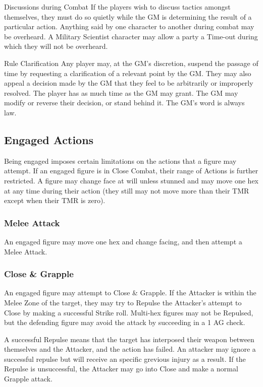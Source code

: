 \begin{multicols*}{3}
\begin{Description}
\item[Discussions during Combat] If the players wish to discuss
tactics amongst themselves, they must do so quietly while the GM is
determining the result of a particular action. Anything said by one
character to another during combat may be overheard. A Military
Scientist character may allow a party a Time-out during which they
will not be overheard.

\item[Rule Clarification] Any player may, at the GM's discretion,
suspend the passage of time by requesting a clarification of a
relevant point by the GM. They may also appeal a decision made by the
GM that they feel to be arbitrarily or improperly resolved. The player
has as much time as the GM may grant. The GM may modify or reverse
their decision, or stand behind it. The GM's word is always law.
\end{Description}

\subsection{Engaged Actions}
\label{combat:engaged}

Being engaged imposes certain limitations on the actions that a figure
may attempt.  If an engaged figure is in Close Combat, their range of
Actions is further restricted.  A figure may change face at will
unless stunned and may move one hex at any time during their action
(they still may not move more than their TMR except when their TMR is
zero).

\subsubsection{Melee Attack}

An engaged figure may move one hex and change facing, and then attempt
a Melee Attack.

\subsubsection{Close \& Grapple}

An engaged figure may attempt to Close \& Grapple. If the Attacker is
within the Melee Zone of the target, they may try to Repulse the
Attacker's attempt to Close by making a successful Strike
roll. Multi-hex figures may not be Repulsed, but the defending figure
may avoid the attack by succeeding in a 1 \x AG check.

A successful Repulse means that the target has interposed their weapon
between themselves and the Attacker, and the action has failed.  An
attacker may ignore a successful repulse but will receive an specific
grevious injury as a result.  If the Repulse is unsuccessful, the
Attacker may go into Close and make a normal Grapple attack.


\end{multicols*}
